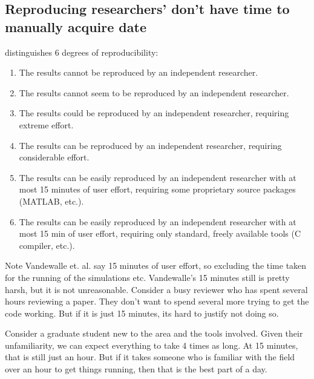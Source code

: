 \documentclass[]{article}
\newcommand{\tcite}{\cite}
\begin{document}
\subsection{Reproducing researchers' don't have time to manually acquire date}
\tcite{VabdewakkeReproduceableResearch} distinguishes 6 degrees of reproducibility:
\begin{enumerate}
\addtocounter{enumi}{-1} %
\item The results cannot be reproduced by an independent researcher.
\item The results cannot seem to be reproduced by an independent researcher.
\item The results could be reproduced by an independent researcher, requiring extreme effort. 
\item The results can be reproduced by an independent researcher, requiring considerable effort.
\item The results can be easily reproduced by an independent researcher with at most 15 minutes of user effort, requiring some proprietary source packages (MATLAB, etc.).
\item The results can be easily reproduced by an independent researcher with at most 15 min of user effort, requiring only standard, freely available tools (C compiler, etc.).
\end{enumerate}
Note Vandewalle et. al. say 15 minutes of user effort, so excluding the time taken for the running of the simulations etc.
Vandewalle's 15 minutes still is pretty harsh, but it is not unreasonable.
Consider a busy reviewer who has spent several hours reviewing a paper.
They don't want to spend several more trying to get the code working.
But if it is just 15 minutes, its hard to justify not doing so.

Consider a graduate student new to the area and the tools involved.
Given their unfamiliarity, we can expect everything to take 4 times as long.
At 15 minutes, that is still just an hour.
But if it takes someone who is familiar with the field over an hour to get things running, then that is the best part of a day.
\end{document}
